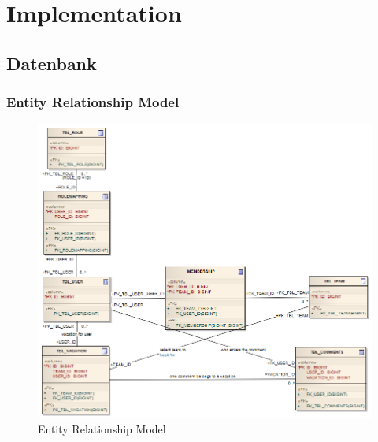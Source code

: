 \chapter{Implementation}
\section{Datenbank}
\subsection{Entity Relationship Model}

\begin{landscape}
\begin{figure}
  \centering
    \includegraphics[width=17cm]{images/erm}
      \caption{Entity Relationship Model}
\end{figure}
	\end{landscape}